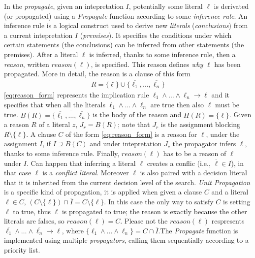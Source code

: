 In the \textit{propagate}, given an intepretation $I$,
potentially some literal $\ell$ is derivated 
(or propagated) using a \textit{Propagate} function according to some \textit{inference rule}.
An inference rule is a logical construct used  
to derive new \textit{literals} (\textit{conclusions}) 
from a current intepretation $I$ (\textit{premises}). 
It specifies the conditions under which certain statements (the conclusions) 
can be inferred from other statements (the premises).
After a literal $\ell$ is inferred, thanks to some inference rule, then a \textit{reason}, written $\mathit{reason}(\ell)$, 
is specified. This reason defines \textit{why} $\ell$ has been propagated.
More in detail, the reason is a clause of this form 
\begin{align}
    \label{eq:reason_form}
    R = \{ \ell \} \cup \{\overline{\ell_1},\hdots, \overline{\ell_n}\}
\end{align}
\eqref{eq:reason_form} represents the implication 
rule $\ell_1 \land \hdots \land \ell_n \rightarrow \ell$ and it specifies 
that when all the literals $\ell_1 \land \hdots \land \ell_n$ are true then also 
$\ell$ must be true. $B(R) = \overline{\{\overline{\ell_1},\hdots, \overline{\ell_n}\}}$
is the body of the reason and $H(R) = \{\ell\}$.
Given a reason $R$ of a literal $z$, $J_r = B(R)$; note that $J_r$ is the 
assignment blocking $R \setminus \{\ell\}$.
A clause $C$ of the form \eqref{eq:reason_form} is a reason for $\ell$, under the assignment $I$, 
if $I \supseteq B(C)$ and under intepretation $J_c$ the propagator 
infers  $\ell$, thanks to some inference rule.
Finally, $\mathit{reason}(\ell)$ has to be a reason of $\ell$ under $I$.
Can happen that inferring a literal $\ell$ creates a conflic (i.e., $\overline{\ell} \in I$),
in that case $\ell$ is a \textit{conflict literal}.
Moreover $\ell$ is also paired with a decision literal 
that it is inherited from the current decision level of the search.
\textit{Unit Propagation} is a specific kind of propagation, it is applied when given a clause 
$C$ and a literal $\ell \in C $, $(C \setminus \{\ell\}) \cap \overline{I} = C \setminus \{\ell\}$.
In this case the only way to satisfy $C$ is setting $\ell$ to true, thus $\ell$
is propagated to true; the reason is exactly because the other literals are falses, so 
$reason(\ell) = C$.
Please not the $reason(\ell)$ respresents $\overline{\ell_1} \land \hdots \land \overline{\ell_n} \rightarrow \ell$, where 
$\{\ell_1 \land \hdots \land \ell_n\} = C \cap \overline{I}$.The \textit{Propagate} function is implemented using multiple \textit{propagators},
calling them sequentially according to a priority list.

